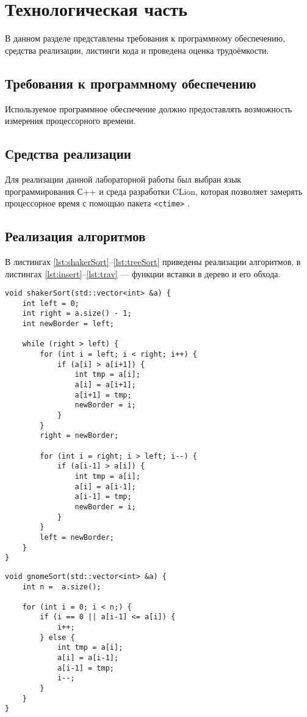 \chapter{Технологическая часть}

В данном разделе представлены требования к программному обеспечению, средства реализации, листинги кода и проведена оценка трудоёмкости.

\section{Требования к программному \newline обеспечению}

Используемое программное обеспечение должно предоставлять возможность измерения процессорного времени.

\section{Средства реализации}

Для реализации данной лабораторной работы был выбран язык программирования С++ \cite{c} и среда разработки CLion, которая позволяет замерять процессорное время с помощью пакета \texttt{<ctime>} \cite{ctime}.

\section{Реализация алгоритмов}

В листингах \ref{lst:shakerSort}--\ref{lst:treeSort} приведены реализации алгоритмов, в листингах \ref{lst:insert}--\ref{lst:trav} --- функции вставки в дерево и его обхода.

\clearpage
\begin{lstlisting}[label=lst:shakerSort,caption=Функция сортировки перемешиванием]
void shakerSort(std::vector<int> &a) {
	int left = 0;
	int right = a.size() - 1;
	int newBorder = left;
	
	while (right > left) {
		for (int i = left; i < right; i++) {
			if (a[i] > a[i+1]) {
				int tmp = a[i];
				a[i] = a[i+1];
				a[i+1] = tmp;
				newBorder = i;
			}
		}
		right = newBorder;
		
		for (int i = right; i > left; i--) {
			if (a[i-1] > a[i]) {
				int tmp = a[i];
				a[i] = a[i-1];
				a[i-1] = tmp;
				newBorder = i;
			}
		}
		left = newBorder;
	}
}	
\end{lstlisting}

\clearpage
\begin{lstlisting}[label=lst:gnomeSort,caption=Функция гномьей сортировки]
void gnomeSort(std::vector<int> &a) {
	int n =  a.size();
	
	for (int i = 0; i < n;) {
		if (i == 0 || a[i-1] <= a[i]) {
			i++;
		} else {
			int tmp = a[i];
			a[i] = a[i-1];
			a[i-1] = tmp;
			i--;
		}
	}
}	
\end{lstlisting}

